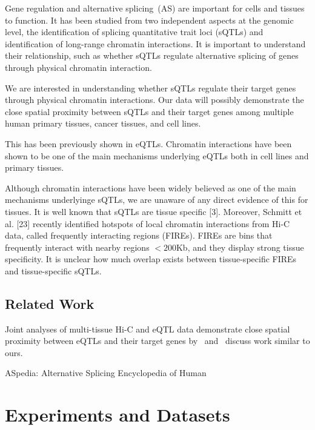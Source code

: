 \documentclass[11pt]{article}
\begin{document}
%
Gene regulation and alternative splicing~(AS) are important for cells
and tissues to function. It has been studied from two independent aspects at
the genomic level, the identification of splicing quantitative trait loci (sQTLs) and identification of long-range
chromatin interactions. It is important to understand their relationship, such as whether sQTLs regulate alternative splicing of
genes through physical chromatin interaction. 

We are interested in understanding whether sQTLs regulate their target
genes through physical chromatin interactions. Our data will possibly demonstrate the close spatial proximity between sQTLs and their target genes
among multiple human primary tissues, cancer tissues, and cell lines.

This has been previously shown in eQTLs. Chromatin interactions have been shown to be
one of the main mechanisms underlying eQTLs both in cell lines and primary tissues.


Although chromatin interactions have been widely believed
as one of the main mechanisms underlyinge sQTLs, we are unaware of any direct evidence of this for
tissues. It is well known that sQTLs are tissue specific [3]. Moreover, Schmitt et al. [23] recently identified hotspots
of local chromatin interactions from Hi-C data, called frequently interacting regions (FIREs). FIREs are
bins that frequently interact with nearby regions $<200$Kb, and they display strong tissue specificity. It is
unclear how much overlap exists between tissue-specific
FIREs and tissue-specific sQTLs.



\subsection{Related Work}

Joint analyses of multi-tissue Hi-C and eQTL data demonstrate close spatial proximity
between eQTLs and their target genes by~\cite{yu2019} and~\cite{duggal2013} discuss work similar to ours. 

ASpedia: Alternative Splicing Encyclopedia of Human

\section{Experiments and Datasets}
\end{document}
